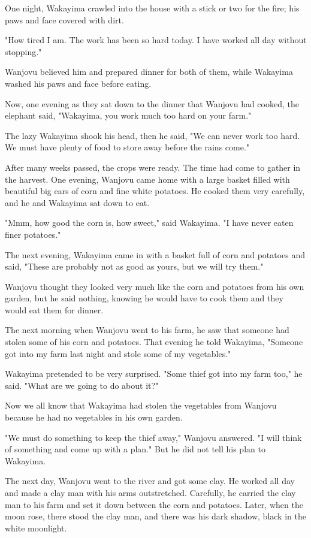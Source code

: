 One night, Wakayima crawled into the house with a stick or two for the fire; his paws and face covered with dirt.

"How tired I am. The work has been so hard today. I have worked all day without stopping."

Wanjovu believed him and prepared dinner for both of them, while Wakayima washed his paws and face before eating.

Now, one evening as they sat down to the dinner that Wanjovu had cooked, the elephant said, "Wakayima, you work much too hard on your farm."

The lazy Wakayima shook his head, then he said, "We can never work too hard. We must have plenty of food to store away before the rains come."

After many weeks passed, the crops were ready. The time had come to gather in the harvest. One evening, Wanjovu came home with a large basket filled with beautiful big ears of corn and fine white potatoes. He cooked them very carefully, and he and Wakayima sat down to eat.

"Mmm, how good the corn is, how sweet," said Wakayima. "I have never eaten finer potatoes."

The next evening, Wakayima came in with a basket full of corn and potatoes and said, "These are probably not as good as yours, but we will try them."

Wanjovu thought they looked very much like the corn and potatoes from his own garden, but he said nothing, knowing he would have to cook them and they would eat them for dinner.

The next morning when Wanjovu went to his farm, he saw that someone had stolen some of his corn and potatoes. That evening he told Wakayima, "Someone got into my farm last night and stole some of my vegetables."

Wakayima pretended to be very surprised. "Some thief got into my farm too," he said. "What are we going to do about it?"

Now we all know that Wakayima had stolen the vegetables from Wanjovu because he had no vegetables in his own garden.

"We must do something to keep the thief away," Wanjovu answered. "I will think of something and come up with a plan." But he did not tell his plan to Wakayima.

The next day, Wanjovu went to the river and got some clay. He worked all day and made a clay man with his arms outstretched. Carefully, he carried the clay man to his farm and set it down between the corn and potatoes. Later, when the moon rose, there stood the clay man, and there was his dark shadow, black in the white moonlight.

